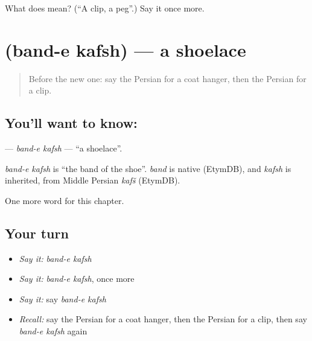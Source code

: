 \begin{tcolorbox}[breakable,colback=teal!4,colframe=teal!35!black,title={Before you move on}]
What does  mean? (\textquotedblleft{}A clip, a peg\textquotedblright{}.) Say it once more.
\end{tcolorbox}
\section[\texorpdfstring{\fa{بند} \fa{کفش} (band-e kafsh)}{بند کفش (band-e kafsh)}]{  (band-e kafsh) — a shoelace}

\label{lesson:FA-C248-band-e-kafsh}



\begin{quote}
Before the new one: say the Persian for a coat hanger, then the Persian for a clip.
\end{quote}

\subsection*{You'll want to know:  }
\textbf{ } — \emph{band-e kafsh} — \textquotedblleft{}a shoelace\textquotedblright{}.

\begin{cousinweb}
\emph{band-e kafsh} is \textquotedblleft{}the band of the shoe\textquotedblright{}. \emph{band} is native (EtymDB), and \emph{kafsh} is inherited, from Middle Persian \emph{kafš} (EtymDB).
\end{cousinweb}

\begin{grammarlens}[title={What you've built}]
One more word for this chapter.
\end{grammarlens}

\subsection*{Your turn}
\begin{itemize}
\raggedright
  \item \emph{Say it:} \emph{band-e kafsh}
  \item \emph{Say it:} \emph{band-e kafsh}, once more
  \item \emph{Say it:} say \emph{band-e kafsh}
  \item \emph{Recall:} say the Persian for a coat hanger, then the Persian for a clip, then say \emph{band-e kafsh} again
\end{itemize}

